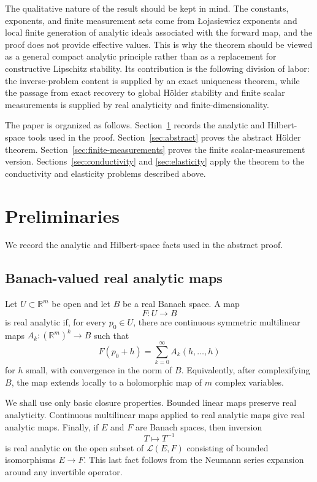 \documentclass[12pt,oneside]{amsart}
\newcommand{\R}{\mathbb R}
\newcommand{\cL}{\mathcal L}
\begin{document}
The qualitative nature of the result should be kept in mind.  The constants,
exponents, and finite measurement sets come from \L{}ojasiewicz exponents and
local finite generation of analytic ideals associated with the forward map, and
the proof does not provide effective values.  This is why the theorem should be
viewed as a general compact analytic principle rather than as a replacement for
constructive Lipschitz stability.  Its contribution is the following division of
labor: the inverse-problem content is supplied by an exact uniqueness theorem,
while the passage from exact recovery to global H\"older stability and finite
scalar measurements is supplied by real analyticity and finite-dimensionality.

The paper is organized as follows.  Section~\ref{sec:preliminaries} records the
analytic and Hilbert-space tools used in the proof.  Section~\ref{sec:abstract}
proves the abstract H\"older theorem.  Section~\ref{sec:finite-measurements}
proves the finite scalar-measurement version.  Sections~\ref{sec:conductivity}
and \ref{sec:elasticity} apply the theorem to the conductivity and elasticity
problems described above.


\section{Preliminaries}\label{sec:preliminaries}

We record the analytic and Hilbert-space facts used in the abstract proof.

\subsection{Banach-valued real analytic maps}

Let $U\subset\R^m$ be open and let $B$ be a real Banach space.  A map
\[
        F:U\to B
\]
is real analytic if, for every $p_0\in U$, there are continuous symmetric multilinear maps $A_k:(\R^m)^k\to B$ such that
\[
        F(p_0+h)=\sum_{k=0}^\infty A_k(h,\ldots,h)
\]
for $h$ small, with convergence in the norm of $B$.  Equivalently, after complexifying $B$, the map extends locally to a holomorphic map of $m$ complex variables.

We shall use only basic closure properties.  Bounded linear maps preserve real analyticity.  Continuous multilinear maps applied to real analytic maps give real analytic maps.  Finally, if $E$ and $F$ are Banach spaces, then inversion
\[
        T\mapsto T^{-1}
\]
is real analytic on the open subset of $\cL(E,F)$ consisting of bounded isomorphisms $E\to F$.  This last fact follows from the Neumann series expansion around any invertible operator.
\end{document}
